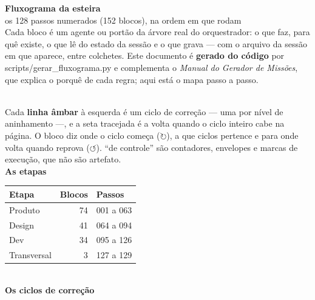 \documentclass[10pt,a4paper]{article}
\newcommand{\cod}[1]{{\ttfamily\footnotesize #1}}
\begin{document}
\thispagestyle{empty}
{\sffamily\color{unNavy}\Huge\bfseries Fluxograma da esteira}\\[0.4em]
{\sffamily\color{unLavanda}\Large os 128 passos numerados (152 blocos), na ordem em que rodam}\\[1.2em]
Cada bloco é um agente ou portão da árvore real do orquestrador: o que faz, para quê existe, o que lê do estado da sessão e o que grava --- com o arquivo da sessão em que aparece, entre colchetes. Este documento é \textbf{gerado do código} por \cod{scripts/gerar\_fluxograma.py} e complementa o \emph{Manual do Gerador de Missões}, que explica o porquê de cada regra; aqui está o mapa passo a passo.\\[1em]
\\[0.8em]
{\scriptsize Cada \textcolor{sinalAmbar}{\textbf{linha âmbar}} à esquerda é um ciclo de correção --- uma por nível de aninhamento ---, e a seta tracejada é a volta quando o ciclo inteiro cabe na página. O bloco diz onde o ciclo começa ($\circlearrowright$), a que ciclos pertence e para onde volta quando reprova ($\circlearrowleft$). ``de controle'' são contadores, envelopes e marcas de execução, que não são artefato.}\\[1em]
{\sffamily\bfseries\color{unNavy} As etapas}\\[0.3em]
\begin{tabularx}{\textwidth}{l r X}\toprule Etapa & Blocos & Passos \\ \midrule
Produto & 74 & 001 a 063 \\
Design & 41 & 064 a 094 \\
Dev & 34 & 095 a 126 \\
Transversal & 3 & 127 a 129 \\
\bottomrule\end{tabularx}\\[1em]
{\sffamily\bfseries\color{unNavy} Os ciclos de correção}\\[0.3em]
\end{document}

